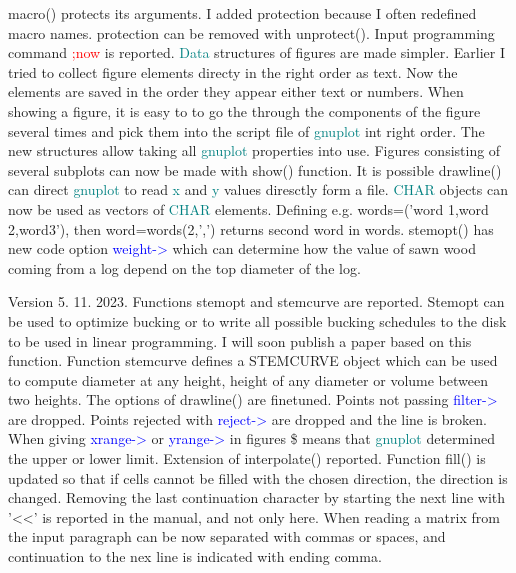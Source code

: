 \textcolor{VioletRed}{macro}() protects its arguments. I added protection because I often redefined macro names. 
protection can be removed with \textcolor{VioletRed}{unprotect}(). 
Input programming command \textcolor{Red}{;now} is reported. \textcolor{teal}{Data} structures of figures are made simpler. 
Earlier I tried to collect figure elements directy in the right order as text. Now 
the elements are saved in the order they appear either text or numbers. 
When showing a figure, it is easy to 
to go the through the components of the figure several times and pick them into the script file of \textcolor{teal}{gnuplot} 
int right order. 
The new structures allow taking all \textcolor{teal}{gnuplot} properties into use. Figures consisting of several 
subplots can now be made with \textcolor{VioletRed}{show}() function. It is possible \textcolor{VioletRed}{drawline}() can direct \textcolor{teal}{gnuplot} to read \textcolor{teal}{x} and \textcolor{teal}{y} values diresctly form a file. 
\textcolor{teal}{CHAR} objects can now be used as vectors of \textcolor{teal}{CHAR} elements. Defining e.g. words=('word 1,word 2,word3'), then word=words(2,',') 
returns second word in words. 
\textcolor{VioletRed}{stemopt}() has new code option \textcolor{blue}{weight->} which can determine how the value of sawn wood coming from a log 
depend on the top diameter of the log. 
 
Version 5. 11. 2023. Functions stemopt and stemcurve are reported. Stemopt can be used to optimize bucking or to write 
all possible bucking schedules to the disk to be used in linear programming. I will soon 
publish a paper based on this function. Function stemcurve defines a STEMCURVE object which can be used 
to compute diameter at any height, height of any diameter or volume between two heights. The options of \textcolor{VioletRed}{drawline}() are finetuned. Points not passing \textcolor{blue}{filter->} are dropped. 
Points rejected with \textcolor{blue}{reject->} are dropped and the line is broken. When giving \textcolor{blue}{xrange->} or \textcolor{blue}{yrange->} 
in figures \$ means that \textcolor{teal}{gnuplot} determined the upper or lower limit. Extension of \textcolor{VioletRed}{interpolate}() reported. 
Function \textcolor{VioletRed}{fill}() is updated so that if cells cannot be filled with the chosen direction, 
the direction is changed. Removing the last continuation character by starting the next 
line with '<<' is reported in the manual, and not only here. When reading a matrix from the input paragraph can be now 
separated with commas or spaces, and continuation to the nex line is indicated with ending comma. 
 
